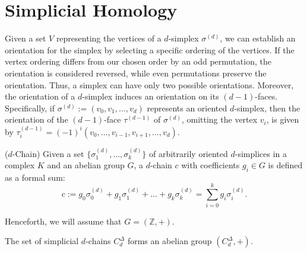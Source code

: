 \section{Simplicial Homology}
\label{Simplicial Homology} Given a set $V$ representing the vertices of a $d$-simplex
$\sigma^{(d)}$, we can establish an orientation for the simplex by selecting a
specific ordering of the vertices. If the vertex ordering differs from our chosen
order by an odd permutation, the orientation is considered reversed, while even permutations
preserve the orientation. Thus, a simplex can have only two possible orientations.
Moreover, the orientation of a $d$-simplex induces an orientation on its $(d-1)$-faces.
Specifically, if $\sigma^{(d)}:= (v_{0}, v_{1}, \ldots, v_{d})$ represents an oriented
$d$-simplex, then the orientation of the $(d-1)$-face $\tau^{(d-1)}$ of
$\sigma^{(d)}$, omitting the vertex $v_{i}$, is given by
$\tau_{i}^{(d-1)}= (-1)^{i} (v_{0}, \ldots, v_{i-1}, v_{i+1}, \ldots, v_{d})$.

\begin{definition}
	{($d$-Chain) \cite[\S 2.3]{zomorodian2004computing}} \label{$d$-Chain} Given a
	set $\{\sigma_{1}^{(d)}, \ldots, \sigma_{k}^{(d)}\}$ of arbitrarily oriented $d$-simplices
	in a complex $K$ and an abelian group $G$, a $d$-chain $c$ with coefficients
	$g_{i} \in G$ is defined as a formal sum:
	\begin{equation}
		c := g_{0}\sigma^{(d)}_{0}+ g_{1}\sigma^{(d)}_{1}+ \ldots + g_{k}\sigma^{(d)}
		_{k}= \sum_{i=0}^{k}g_{i}\sigma^{(d)}_{i}.
	\end{equation}
\end{definition}

Henceforth, we will assume that $G = (\mathbb{Z}, +)$.

\begin{lemma}
	The set of simplicial $d$-chains $C^{\Delta}_{d}$ forms an abelian group $(C^{\Delta}
	_{d}, +)$.
\end{lemma}

